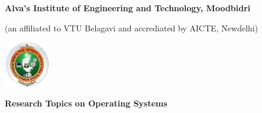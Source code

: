 \documentclass{article}
\begin{document}
\begin{center}
 \LARGE \bfseries{Alva's Institute of Engineering and Technology, Moodbidri}
 
 \begin{small}
 (an affiliated to VTU Belagavi and accrediated by AICTE, Newdelhi)
 
 \vspace{1cm}
 \begin{center}
 \includegraphics[width=2cm]{VTU-logo.jpg}
 \end{center}
 \end{small}
 \vspace{1cm}
 \Large \bfseries{Research Topics on Operating Systems}
\end{center} 
\end{document}

